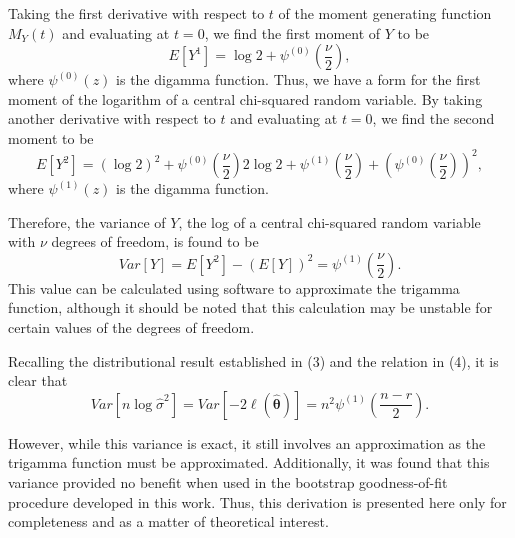 \documentclass[sn-mathphys-ay]{sn-jnl}
\begin{document}
Taking the first derivative with respect to $t$ of the moment generating function $M_Y (t)$ and evaluating at $t=0$, we find the first moment of $Y$ to be
\begin{equation*}
	E \left[ Y^1 \right] =  \log 2 + \psi^{(0)} \left( \frac{\nu}{2} \right) ,
\end{equation*}
where $\psi^{(0)}(z)$ is the digamma function. Thus, we have a form for the first moment of the logarithm of a central chi-squared random variable. By taking another
derivative with respect to $t$ and evaluating at $t=0$, we find the second moment to be
\begin{equation*}
	E \left[ Y^2 \right] =
	(\log 2)^2 + \psi^{(0)} \left( \frac{\nu}{2} \right) 2 \log 2  + \psi^{(1)} \left( \frac{\nu}{2} \right) + \left( \psi^{(0)} \left( \frac{\nu}{2} \right) \right)^2 ,
\end{equation*}
where $\psi^{(1)}(z)$ is the digamma function.

Therefore, the variance of $Y$, the log of a central chi-squared random variable with
$\nu$ degrees of freedom, is found to be
\begin{equation*}
	Var \left[ Y \right] = E \left[ Y^2 \right] - \left( E \left[ Y \right] \right)^2 = \psi^{(1)} \left( \frac{\nu}{2} \right) .
\end{equation*}
This value can be calculated using software to approximate the trigamma function, although it should be noted that this calculation may be unstable for certain values of the degrees of freedom.

Recalling the distributional result established in (3) and the relation in (4), it is clear that
\begin{equation*}
	Var \left[ n \log \hat{\sigma}^2 \right] = Var \left[ -2 \ell (\hat{\bm{\theta}} ) \right] = n^2 \psi^{(1)} \left( \frac{n-r}{2} \right).
\end{equation*}

However, while this variance is exact, it still involves an approximation as the trigamma function must be approximated. Additionally, it was found that
this variance provided no benefit when used in the bootstrap goodness-of-fit procedure developed in this work. Thus, this derivation is presented here only
for completeness and as a matter of theoretical interest.



%

\end{document}
